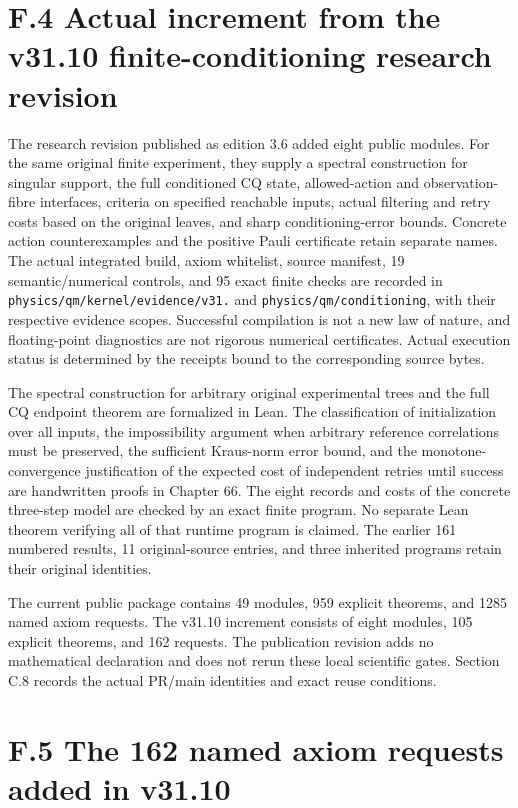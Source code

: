 \documentclass[
  11pt,
  oneside]{book}
\begin{document}
\section{F.4 Actual increment from the v31.10 finite-conditioning
research revision}

The research revision published as edition 3.6 added eight public
modules. For the same original finite experiment, they supply a spectral
construction for singular support, the full conditioned CQ state,
allowed-action and observation-fibre interfaces, criteria on specified
reachable inputs, actual filtering and retry costs based on the original
leaves, and sharp conditioning-error bounds. Concrete action
counterexamples and the positive Pauli certificate retain separate
names. The actual integrated build, axiom whitelist, source manifest, 19
semantic/numerical controls, and 95 exact finite checks are recorded in
\texttt{physics/\allowbreak qm/\allowbreak kernel/\allowbreak evidence/\allowbreak v31.} and
\texttt{physics/\allowbreak qm/\allowbreak conditioning}, with their respective evidence scopes.
Successful compilation is not a new law of nature, and floating-point
diagnostics are not rigorous numerical certificates. Actual execution
status is determined by the receipts bound to the corresponding source
bytes.

The spectral construction for arbitrary original experimental trees and
the full CQ endpoint theorem are formalized in Lean. The classification
of initialization over all inputs, the impossibility argument when
arbitrary reference correlations must be preserved, the sufficient
Kraus-norm error bound, and the monotone-convergence justification of
the expected cost of independent retries until success are handwritten
proofs in Chapter 66. The eight records and costs of the concrete
three-step model are checked by an exact finite program. No separate
Lean theorem verifying all of that runtime program is claimed. The
earlier 161 numbered results, 11 original-source entries, and three
inherited programs retain their original identities.

The current public package contains 49 modules, 959 explicit theorems,
and 1285 named axiom requests. The v31.10 increment consists of eight
modules, 105 explicit theorems, and 162 requests. The publication
revision adds no mathematical declaration and does not rerun these local
scientific gates. Section C.8 records the actual PR/main identities and
exact reuse conditions.

\section{F.5 The 162 named axiom requests added in v31.10}
\end{document}
